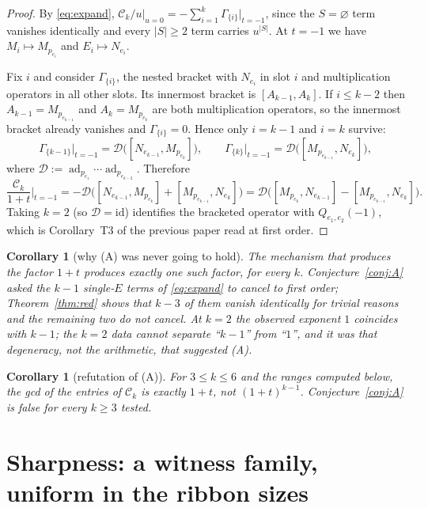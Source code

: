 \documentclass[11pt]{article}
\newtheorem{corollary}[theorem]{Corollary}
\theoremstyle{definition}
\newcommand{\Ck}{\mathcal{C}}
\begin{document}
\begin{proof}
By \eqref{eq:expand}, $\Ck_k/u\big|_{u=0}=-\sum_{i=1}^{k}\Gamma_{\{i\}}\big|_{t=-1}$, since the
$S=\varnothing$ term vanishes identically and every $|S|\ge2$ term carries $u^{|S|}$. At $t=-1$
we have $M_i\mapsto M_{p_{e_i}}$ and $E_i\mapsto N_{e_i}$.

Fix $i$ and consider $\Gamma_{\{i\}}$, the nested bracket with $N_{e_i}$ in slot $i$ and
multiplication operators in all other slots. Its innermost bracket is $[A_{k-1},A_k]$. If
$i\le k-2$ then $A_{k-1}=M_{p_{e_{k-1}}}$ and $A_k=M_{p_{e_k}}$ are both multiplication operators,
so the innermost bracket already vanishes and $\Gamma_{\{i\}}=0$. Hence only $i=k-1$ and $i=k$
survive:
\[
\Gamma_{\{k-1\}}\big|_{t=-1}=\mathcal D\bigl([N_{e_{k-1}},M_{p_{e_k}}]\bigr),
\qquad
\Gamma_{\{k\}}\big|_{t=-1}=\mathcal D\bigl([M_{p_{e_{k-1}}},N_{e_k}]\bigr),
\]
where $\mathcal D:=\operatorname{ad}_{p_{e_1}}\cdots\operatorname{ad}_{p_{e_{k-2}}}$. Therefore
\[
\frac{\Ck_k}{1+t}\Bigg|_{t=-1}
=-\mathcal D\bigl([N_{e_{k-1}},M_{p_{e_k}}]+[M_{p_{e_{k-1}}},N_{e_k}]\bigr)
=\mathcal D\bigl([M_{p_{e_k}},N_{e_{k-1}}]-[M_{p_{e_{k-1}}},N_{e_k}]\bigr).
\]
Taking $k=2$ (so $\mathcal D=\mathrm{id}$) identifies the bracketed operator with
$Q_{e_1,e_2}(-1)$, which is Corollary~T3 of the previous paper read at first order.
\end{proof}

\begin{corollary}[why (A) was never going to hold]\label{cor:whyA}
The mechanism that produces the factor $1+t$ produces exactly one such factor, for every $k$.
Conjecture~\ref{conj:A} asked the $k-1$ single-$E$ terms of \eqref{eq:expand} to cancel to first
order; Theorem~\ref{thm:red} shows that $k-3$ of them vanish identically for trivial reasons and
the remaining two do not cancel. At $k=2$ the observed exponent $1$ coincides with $k-1$; the
$k=2$ data cannot separate ``$k-1$'' from ``$1$'', and it was that degeneracy, not the arithmetic,
that suggested (A).
\end{corollary}

\begin{corollary}[refutation of (A)]\label{cor:A}
For $3\le k\le6$ and the ranges computed below, the gcd of the entries of $\Ck_k$ is exactly
$1+t$, not $(1+t)^{k-1}$. Conjecture~\ref{conj:A} is false for every $k\ge3$ tested.
\end{corollary}

\section{Sharpness: a witness family, uniform in the ribbon sizes}
\end{document}
